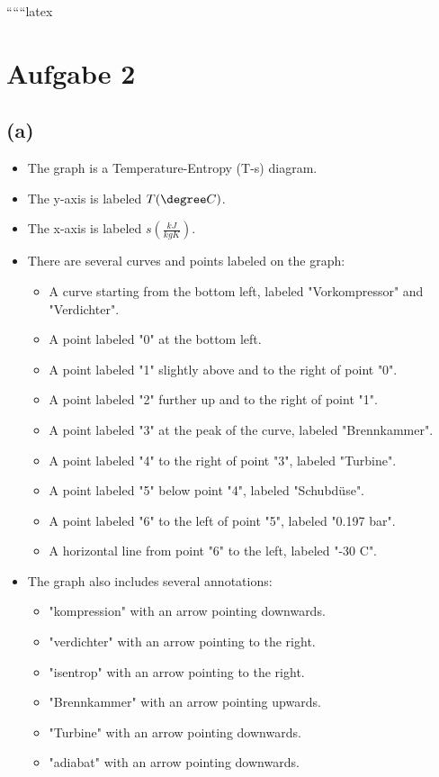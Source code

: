 
``````latex


\section*{Aufgabe 2}

\subsection*{(a)}

\begin{itemize}
    \item The graph is a Temperature-Entropy (T-s) diagram.
    \item The y-axis is labeled \( T (\degree C) \).
    \item The x-axis is labeled \( s \left( \frac{kJ}{kgK} \right) \).
    \item There are several curves and points labeled on the graph:
        \begin{itemize}
            \item A curve starting from the bottom left, labeled "Vorkompressor" and "Verdichter".
            \item A point labeled "0" at the bottom left.
            \item A point labeled "1" slightly above and to the right of point "0".
            \item A point labeled "2" further up and to the right of point "1".
            \item A point labeled "3" at the peak of the curve, labeled "Brennkammer".
            \item A point labeled "4" to the right of point "3", labeled "Turbine".
            \item A point labeled "5" below point "4", labeled "Schubdüse".
            \item A point labeled "6" to the left of point "5", labeled "0.197 bar".
            \item A horizontal line from point "6" to the left, labeled "-30 \degree C".
        \end{itemize}
    \item The graph also includes several annotations:
        \begin{itemize}
            \item "kompression" with an arrow pointing downwards.
            \item "verdichter" with an arrow pointing to the right.
            \item "isentrop" with an arrow pointing to the right.
            \item "Brennkammer" with an arrow pointing upwards.
            \item "Turbine" with an arrow pointing downwards.
            \item "adiabat" with an arrow pointing downwards.
        \end{itemize}
\end{itemize}

